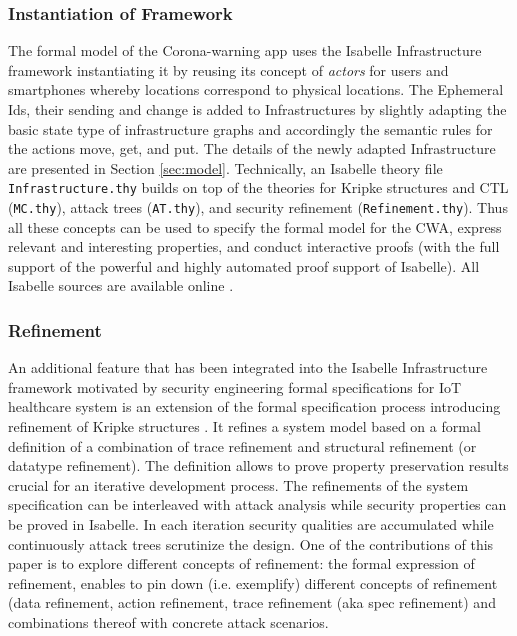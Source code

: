 \documentclass{llncs}
\begin{document}
\subsubsection{Instantiation of Framework}
The formal model of the Corona-warning app uses the Isabelle Infrastructure framework instantiating it
by reusing its concept of {\it actors} for users and smartphones whereby locations correspond
to physical locations. The Ephemeral Ids, their sending and change is added to Infrastructures
by slightly adapting the basic state type of infrastructure graphs and accordingly the semantic rules
for the actions move, get, and put. The details of the newly adapted Infrastructure are
presented in Section \ref{sec:model}.
Technically, an Isabelle theory file \texttt{Infrastructure.thy} builds on top of the theories for Kripke 
structures and CTL (\texttt{MC.thy}), attack trees (\texttt{AT.thy}), and security refinement 
(\texttt{Refinement.thy}). Thus all these concepts can be used to specify the formal model
for the CWA, express relevant and interesting properties, and conduct
interactive proofs (with the full support of the powerful and highly automated proof support
of Isabelle).
All Isabelle sources are available online \cite{kam:20gitsc}.

\subsubsection{Refinement}
An additional feature that has been integrated into the Isabelle Infrastructure
framework motivated by security engineering formal specifications for IoT healthcare
system is an extension of the formal specification process introducing
refinement of Kripke structures \cite{kam:19a,kam:20a}. It refines a system model based on a 
formal definition of a combination of trace refinement and structural 
refinement (or datatype refinement). The definition allows to prove property preservation results 
crucial for an iterative development process.
The refinements of the system specification  can be interleaved with attack 
analysis while security properties can be proved in Isabelle. In each iteration
security qualities are accumulated while continuously attack trees scrutinize
the design.
One of the contributions of this paper is to explore different concepts of refinement:
the formal expression of refinement, enables to pin down (i.e. exemplify) different concepts
of refinement (data refinement, action refinement, trace refinement (aka spec refinement) and
combinations thereof with concrete attack scenarios. 
\end{document}
